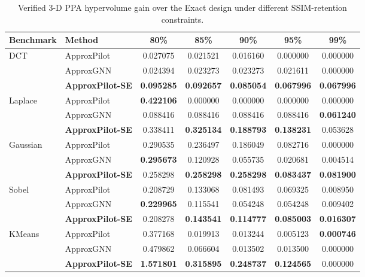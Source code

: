 \begin{table}[!t]
\centering
\caption{Verified 3-D PPA hypervolume gain over the Exact design
under different SSIM-retention constraints.}
\label{tab:verified_hv_all}
\footnotesize
\renewcommand{\arraystretch}{1.08}

\begin{tabular*}{\textwidth}
{@{\extracolsep{\fill}} l l c c c c c @{}}
\toprule
\textbf{Benchmark} &
\textbf{Method} &
\textbf{80\%} &
\textbf{85\%} &
\textbf{90\%} &
\textbf{95\%} &
\textbf{99\%} \\
\midrule

\multirow{3}{*}{DCT}
& ApproxPilot
& 0.027075
& 0.021521
& 0.016160
& 0.000000
& 0.000000 \\
& ApproxGNN
& 0.024394
& 0.023273
& 0.023273
& 0.021611
& 0.000000 \\
& \textbf{ApproxPilot-SE}
& \textbf{0.095285}
& \textbf{0.092657}
& \textbf{0.085054}
& \textbf{0.067996}
& \textbf{0.067996} \\

\midrule

\multirow{3}{*}{Laplace}
& ApproxPilot
& \textbf{0.422106}
& 0.000000
& 0.000000
& 0.000000
& 0.000000 \\
& ApproxGNN
& 0.088416
& 0.088416
& 0.088416
& 0.088416
& \textbf{0.061240} \\
& \textbf{ApproxPilot-SE}
& 0.338411
& \textbf{0.325134}
& \textbf{0.188793}
& \textbf{0.138231}
& 0.053628 \\

\midrule

\multirow{3}{*}{Gaussian}
& ApproxPilot
& 0.290535
& 0.236497
& 0.186049
& 0.082716
& 0.000000 \\
& ApproxGNN
& \textbf{0.295673}
& 0.120928
& 0.055735
& 0.020681
& 0.004514 \\
& \textbf{ApproxPilot-SE}
& 0.258298
& \textbf{0.258298}
& \textbf{0.258298}
& \textbf{0.083437}
& \textbf{0.081900} \\

\midrule

\multirow{3}{*}{Sobel}
& ApproxPilot
& 0.208729
& 0.133068
& 0.081493
& 0.069325
& 0.008950 \\
& ApproxGNN
& \textbf{0.229965}
& 0.115541
& 0.054248
& 0.054248
& 0.009402 \\
& \textbf{ApproxPilot-SE}
& 0.208278
& \textbf{0.143541}
& \textbf{0.114777}
& \textbf{0.085003}
& \textbf{0.016307} \\

\midrule

\multirow{3}{*}{KMeans}
& ApproxPilot
& 0.377168
& 0.019913
& 0.013244
& 0.005123
& \textbf{0.000746} \\
& ApproxGNN
& 0.479862
& 0.066604
& 0.013502
& 0.013500
& 0.000000 \\
& \textbf{ApproxPilot-SE}
& \textbf{1.571801}
& \textbf{0.315895}
& \textbf{0.248737}
& \textbf{0.124565}
& 0.000000 \\


\bottomrule
\end{tabular*}
\end{table}

